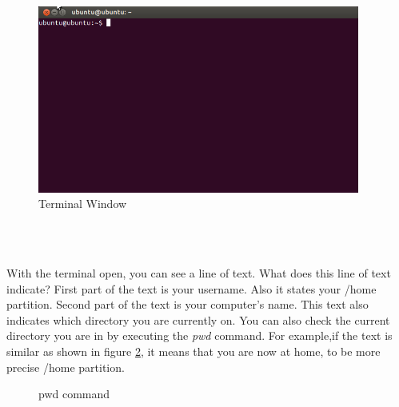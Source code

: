 \begin{figure}[h]	
	\centering
	\includegraphics[width=300pt]{./images/terminal/terminal-window.png}
	\caption{Terminal Window}	
	\label{fig:terminal-window}	
\end{figure}

\par \noindent {} \\ \\

\par \noindent With the terminal open, you can see a line of text.  What does this line of text indicate? First part of the text is your username. Also it states your /home partition. Second part of the text is your computer's name. This text also indicates which directory you are currently on. You can also check the current directory you are in by executing the \textit{pwd} command. For example,if the text is similar as shown in figure \ref{fig:pwd-command}, it means that you are now at home, to be more precise /home partition. \\

\begin{figure}[h]	
	\centering
	\caption{pwd command}	
	\label{fig:pwd-command}	
\end{figure}

